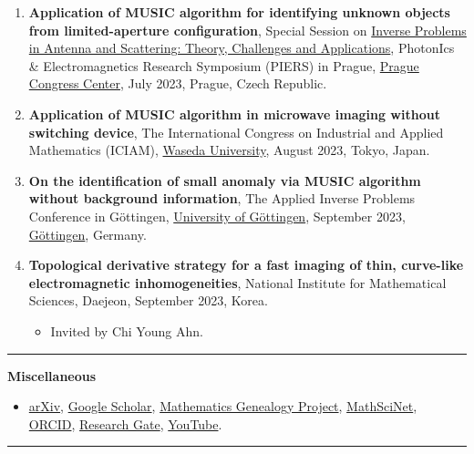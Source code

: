 \documentclass[10pt,A4]{article}
\newcommand{\cvsection}[1]
{
	\begin{center}
		\large\textcolor{sectcol}{\textbf{#1}}
	\end{center}
}
\begin{document}
\begin{enumerate}
\item\label{P-PIERS2023} \textbf{Application of MUSIC algorithm for identifying unknown objects from limited-aperture configuration}, Special Session on \href{https://prague2023.piers.org/session.html?sid=S093}{Inverse Problems in Antenna and Scattering: Theory, Challenges and Applications}, PhotonIcs \& Electromagnetics Research Symposium (PIERS) in Prague, \href{https://www.praguecc.cz/en/homepage}{Prague Congress Center}, July 2023, Prague, Czech Republic.
\item\label{P-ICIAM2023} \textbf{Application of MUSIC algorithm in microwave imaging without switching device}, The  International Congress on Industrial and Applied Mathematics (ICIAM), \href{https://www.waseda.jp/top/en/}{Waseda University}, August 2023, Tokyo, Japan.
\item\label{P-AIP2023} \textbf{On the identification of small anomaly via MUSIC algorithm without background information}, The  Applied Inverse Problems Conference in G\"ottingen, \href{https://www.uni-goettingen.de}{University of G\"ottingen}, September 2023, \href{https://www.goettingen-tourismus.de}{G\"ottingen}, Germany.
\item\label{P-NIMS2023B} \textbf{Topological derivative strategy for a fast imaging of thin, curve-like electromagnetic inhomogeneities}, National Institute for Mathematical Sciences, Daejeon, September 2023, Korea.
    \begin{itemize}
\item Invited by Chi Young Ahn.
\end{itemize}
\end{enumerate}
\textcolor{softcol}{\hrule}

\cvsection{Miscellaneous}
\begin{itemize}
\item \href{http://arxiv.org/a/park_w_1.atom}{{arXiv}}, \href{http://scholar.google.com/citations?user=tCCV9NUAAAAJ&hl=kr}{{Google Scholar}}, \href{http://genealogy.math.ndsu.nodak.edu/id.php?id=140061}{{Mathematics Genealogy Project}}, \href{http://www.ams.org/mathscinet/search/publications.html?pg1=INDI&s1=874378}{{MathSciNet}}, \href{https://orcid.org/0000-0001-9418-2455}{{ORCID}}, \href{https://www.researchgate.net/profile/Won-Kwang_Park}{{Research Gate}}, \href{https://www.youtube.com/user/aleste2009}{YouTube}.
\end{itemize}

\textcolor{softcol}{\hrule}\vspace{6pt}
\end{document}
